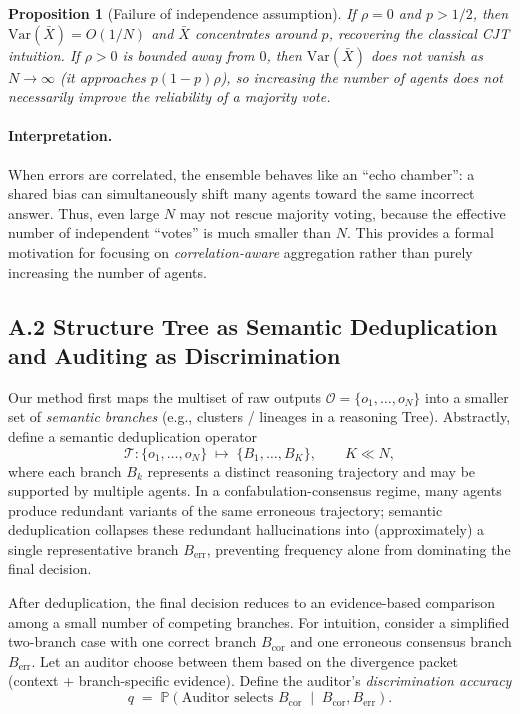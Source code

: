 \documentclass{article}
\theoremstyle{plain}
\newtheorem{proposition}[theorem]{Proposition}
\theoremstyle{definition}
\theoremstyle{remark}
\begin{document}
\begin{proposition}[Failure of independence assumption]
\label{prop:mv_correlation}
If $\rho=0$ and $p>1/2$, then $\mathrm{Var}(\bar{X})=O(1/N)$ and $\bar{X}$ concentrates around $p$, recovering the classical CJT intuition.
If $\rho>0$ is bounded away from $0$, then $\mathrm{Var}(\bar{X})$ does not vanish as $N\to\infty$ (it approaches $p(1-p)\rho$),
so increasing the number of agents does not necessarily improve the reliability of a majority vote.
\end{proposition}

\paragraph{Interpretation.}
When errors are correlated, the ensemble behaves like an ``echo chamber'': a shared bias can simultaneously shift many agents toward the same
incorrect answer. Thus, even large $N$ may not rescue majority voting, because the effective number of independent ``votes'' is much smaller than $N$.
This provides a formal motivation for focusing on \emph{correlation-aware} aggregation rather than purely increasing the number of agents.

\subsection{A.2 Structure Tree as Semantic Deduplication and Auditing as Discrimination}

Our method first maps the multiset of raw outputs $\mathcal{O}=\{o_1,\dots,o_N\}$ into a smaller set of \emph{semantic branches}
(e.g., clusters / lineages in a reasoning Tree). Abstractly, define a semantic deduplication operator
\begin{equation}
\label{eq:dedup_operator}
\mathcal{T}:\{o_1,\dots,o_N\}\;\mapsto\;\{B_1,\dots,B_K\}, \qquad K\ll N,
\end{equation}
where each branch $B_k$ represents a distinct reasoning trajectory and may be supported by multiple agents.
In a confabulation-consensus regime, many agents produce redundant variants of the same erroneous trajectory;
semantic deduplication collapses these redundant hallucinations into (approximately) a single representative branch $B_{\mathrm{err}}$,
preventing frequency alone from dominating the final decision.

After deduplication, the final decision reduces to an evidence-based comparison among a small number of competing branches.
For intuition, consider a simplified two-branch case with one correct branch $B_{\mathrm{cor}}$ and one erroneous consensus branch $B_{\mathrm{err}}$.
Let an auditor choose between them based on the divergence packet (context + branch-specific evidence).
Define the auditor's \emph{discrimination accuracy}
\begin{equation}
\label{eq:q_def}
q \;=\; \mathbb{P}\!\left(\text{Auditor selects } B_{\mathrm{cor}} \;\middle|\; B_{\mathrm{cor}},B_{\mathrm{err}}\right).
\end{equation}
\end{document}
